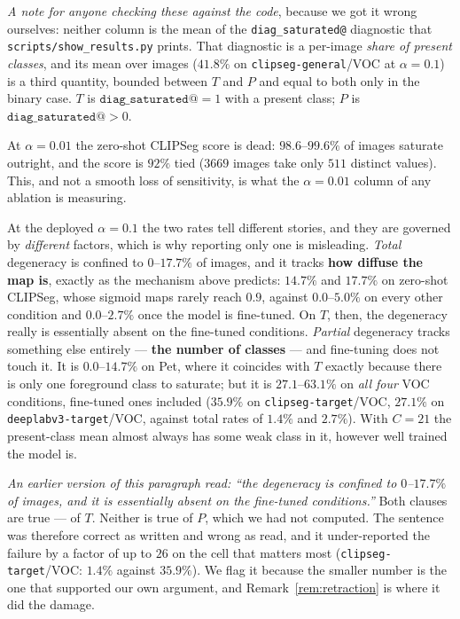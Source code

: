 \documentclass[11pt]{article}
\theoremstyle{remark}
\begin{document}
\emph{A note for anyone checking these against the code}, because we got it wrong
ourselves: neither column is the mean of the \texttt{diag\_saturated@} diagnostic
that \texttt{scripts/show\_results.py} prints. That diagnostic is a per-image
\emph{share of present classes}, and its mean over images ($41.8\%$ on
\texttt{clipseg-general}/VOC at $\alpha=0.1$) is a third quantity, bounded between
$T$ and $P$ and equal to both only in the binary case. $T$ is
$\texttt{diag\_saturated@}=1$ with a present class; $P$ is
$\texttt{diag\_saturated@}>0$.

At $\alpha=0.01$ the zero-shot CLIPSeg score is dead: $98.6$--$99.6\%$ of images
saturate outright, and the score is $92\%$ tied ($3669$ images take only $511$
distinct values). This, and not a smooth loss of sensitivity, is what the
$\alpha=0.01$ column of any ablation is measuring.

At the deployed $\alpha=0.1$ the two rates tell different stories, and they are
governed by \emph{different} factors, which is why reporting only one is
misleading. \emph{Total} degeneracy is confined to $0$--$17.7\%$ of images, and it
tracks \textbf{how diffuse the map is}, exactly as the mechanism above predicts:
$14.7\%$ and $17.7\%$ on zero-shot CLIPSeg, whose sigmoid maps rarely reach $0.9$,
against $0.0$--$5.0\%$ on every other condition and $0.0$--$2.7\%$ once the model is
fine-tuned. On $T$, then, the degeneracy really is essentially absent on the
fine-tuned conditions. \emph{Partial}
degeneracy tracks something else entirely --- \textbf{the number of classes} --- and
fine-tuning does not touch it. It is $0.0$--$14.7\%$ on Pet, where it coincides with
$T$ exactly because there is only one foreground class to saturate; but it is
$27.1$--$63.1\%$ on \emph{all four} VOC conditions, fine-tuned ones included
($35.9\%$ on \texttt{clipseg-target}/VOC, $27.1\%$ on \texttt{deeplabv3-target}/VOC,
against total rates of $1.4\%$ and $2.7\%$). With $C=21$ the present-class mean
almost always has some weak class in it, however well trained the model is.

\emph{An earlier version of this paragraph read: ``the degeneracy is confined to
$0$--$17.7\%$ of images, and it is essentially absent on the fine-tuned
conditions.''} Both clauses are true --- of $T$. Neither is true of $P$, which we had
not computed. The sentence was therefore correct as written and wrong as read, and
it under-reported the failure by a factor of up to $26$ on the cell that matters most
(\texttt{clipseg-target}/VOC: $1.4\%$ against $35.9\%$). We flag it because the
smaller number is the one that supported our own argument, and Remark~\ref{rem:retraction}
is where it did the damage.
\end{document}
